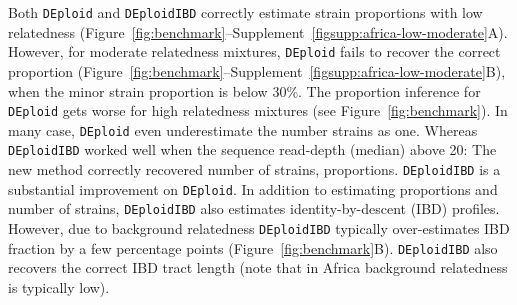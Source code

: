 \documentclass[9pt,lineno]{elife}
\begin{document}
Both \texttt{DEploid} and \texttt{DEploidIBD} correctly estimate strain proportions with low relatedness (Figure~\ref{fig:benchmark}--Supplement~\ref{figsupp:africa-low-moderate}A). However, for moderate relatedness mixtures, \texttt{DEploid} fails to recover the correct proportion (Figure~\ref{fig:benchmark}--Supplement~\ref*{figsupp:africa-low-moderate}B), when the minor strain proportion is below 30\%. The proportion inference for \texttt{DEploid} gets worse for high relatedness mixtures (see Figure~\ref*{fig:benchmark}). In many case, \texttt{DEploid} even underestimate the number strains as one. Whereas \texttt{DEploidIBD} worked well when the sequence read-depth (median) above 20: The new method correctly recovered number of strains, proportions. \texttt{DEploidIBD} is a substantial improvement on \texttt{DEploid}. In addition to estimating proportions and number of strains, \texttt{DEploidIBD} also estimates identity-by-descent (IBD) profiles. However, due to background relatedness {\tt DEploidIBD} typically over-estimates IBD fraction by a few percentage points (Figure~\ref{fig:benchmark}B). \texttt{DEploidIBD} also recovers the correct IBD tract length (note that in Africa background relatedness is typically low).




\end{document}
